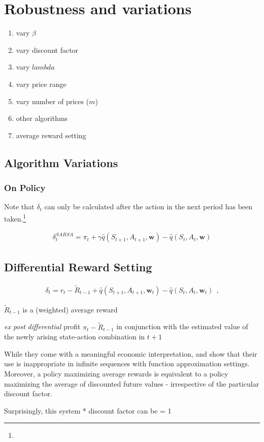 \section{Robustness and variations}\label{robustness}

\begin{enumerate}
	\item vary $\beta$
	\item vary discount factor
	\item vary $lambda$
	\item vary price range
	\item vary number of prices ($m$)
	\item other algorithms
	\item average reward setting
\end{enumerate}

\subsection{Algorithm Variations}\label{vary_algorithm}

\subsubsection{On Policy}

Note that $\delta_t$ can only be calculated after the action in the next period has been taken.\footnote{}

\begin{gather}
	\delta_t^{SARSA} = \pi_t + \gamma \hat{q}(S_{t+1}, A_{t+1}, \boldsymbol{w}) - \hat{q}(S_t, A_t, \boldsymbol{w})
\end{gather}
		

\subsection{Differential Reward Setting}

\begin{gather}
\delta_t = r_t - \widetilde{R}_{t-1} + \hat{q}(S_{t+1}, A_{t+1}, \boldsymbol{w}_t) - \hat{q}(S_t, A_t, \boldsymbol{w}_t) ~~   \text{,}
\end{gather}

$\widetilde{R}_{t-1}$ is a (weighted) average reward

\emph{ex post} \emph{differential} profit $\pi_t - \widetilde{R}_{t-1}$ in conjunction with the estimated value of the newly arising state-action combination in $t+1$

While they come with a meaningful economic interpretation, \textcite{sutton_reinforcement_2018} and \textcite{naik_discounted_2019} show that their use is inappropriate in infinite sequences with function approximation settings. Moreover, a policy maximizing average rewards is equivalent to a policy maximizing the average of discounted future values - irrespective of the particular discount factor.

Surprisingly, this system 
* discount factor can be = 1




\pagebreak